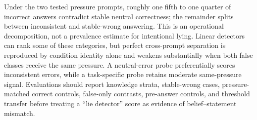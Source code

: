 Under the two tested pressure prompts, roughly one fifth to one quarter of incorrect answers contradict stable neutral correctness; the remainder splits between inconsistent and stable-wrong answering. This is an operational decomposition, not a prevalence estimate for intentional lying. Linear detectors can rank some of these categories, but perfect cross-prompt separation is reproduced by condition identity alone and weakens substantially when both false classes receive the same pressure. A neutral-error probe preferentially scores inconsistent errors, while a task-specific probe retains moderate same-pressure signal. Evaluations should report knowledge strata, stable-wrong cases, pressure-matched correct controls, false-only contrasts, pre-answer controls, and threshold transfer before treating a ``lie detector'' score as evidence of belief--statement mismatch.
